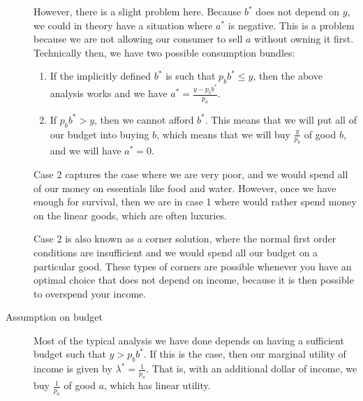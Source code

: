 \begin{description}
    However, there is a slight problem here. Because $b^*$ does not depend on $y$, we could in theory have a situation where $a^*$ is negative. This is a problem because we are not allowing our consumer to sell $a$ without owning it first. Technically then, we have two possible consumption bundles:
    \begin{enumerate}
        \item If the implicitly defined $b^*$ is such that $p_b b^* \leq y$, then the above analysis works and we have $a^* = \frac{y - p_b b^*}{p_a}$.
        \item If $p_b b^* > y$, then we cannot afford $b^*$. This means that we will put all of our budget into buying $b$, which means that we will buy $\frac{y}{p_b}$ of good $b$, and we will have $a^* = 0$.  
   \end{enumerate}
   Case 2 captures the case where we are very poor, and we would spend all of our money on essentials like food and water. However, once we have enough for survival, then we are in case 1 where would rather spend money on the linear goods, which are often luxuries.

   Case 2 is also known as a corner solution, where the normal first order conditions are insufficient and we would spend all our budget on a particular good. These types of corners are possible whenever you have an optimal choice that does not depend on income, because it is then possible to overspend your income. 
   
   \item[Assumption on budget] Most of the typical analysis we have done depends on having a sufficient budget such that $y > p_b b^*$. If this is the case, then our marginal utility of income is given by $\lambda^* = \frac{1}{p_a}$. That is, with an additional dollar of income, we buy $\frac{1}{p_a}$ of good $a$, which has linear utility. 
\end{description}